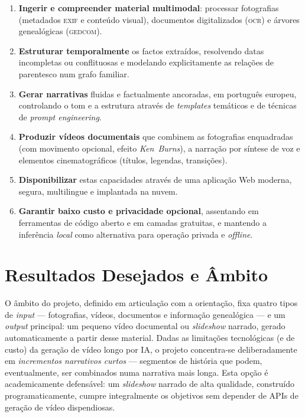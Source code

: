 \begin{enumerate}[label=\textbf{O\arabic*.},leftmargin=*]
  \item \textbf{Ingerir e compreender material multimodal}: processar
  fotografias (metadados \textsc{exif} e conteúdo visual), documentos
  digitalizados (\textsc{ocr}) e árvores genealógicas (\textsc{gedcom}).
  \item \textbf{Estruturar temporalmente} os factos extraídos, resolvendo
  datas incompletas ou conflituosas e modelando explicitamente as
  relações de parentesco num grafo familiar.
  \item \textbf{Gerar narrativas} fluidas e factualmente ancoradas, em
  português europeu, controlando o tom e a estrutura através de
  \emph{templates} temáticos e de técnicas de \emph{prompt engineering}.
  \item \textbf{Produzir vídeos documentais} que combinem as fotografias
  enquadradas (com movimento opcional, efeito \emph{Ken~Burns}), a narração
  por síntese de voz e elementos cinematográficos (títulos, legendas,
  transições).
  \item \textbf{Disponibilizar} estas capacidades através de uma aplicação
  Web moderna, segura, multilingue e implantada na nuvem.
  \item \textbf{Garantir baixo custo e privacidade opcional}, assentando em
  ferramentas de código aberto e em camadas gratuitas, e mantendo a
  inferência \emph{local} como alternativa para operação privada e
  \emph{offline}.
\end{enumerate}

\section{Resultados Desejados e Âmbito}
\label{sec:ambito}

O âmbito do projeto, definido em articulação com a orientação, fixa
quatro tipos de \emph{input} — fotografias, vídeos, documentos e
informação genealógica — e um \emph{output} principal: um pequeno vídeo
documental ou \emph{slideshow} narrado, gerado automaticamente a partir
desse material. Dadas as limitações tecnológicas (e de custo) da geração
de vídeo longo por IA, o projeto concentra-se deliberadamente em
\emph{incrementos narrativos curtos} — segmentos de história que podem,
eventualmente, ser combinados numa narrativa mais longa. Esta opção é
academicamente defensável: um \emph{slideshow} narrado de alta qualidade,
construído programaticamente, cumpre integralmente os objetivos sem
depender de APIs de geração de vídeo dispendiosas.

